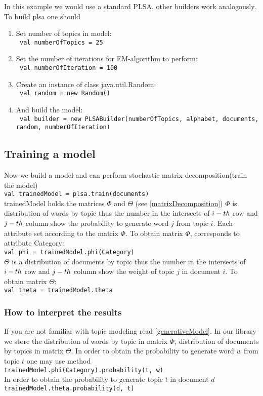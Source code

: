     In this example we would
    use a standard PLSA, other builders work analogously.  To build plsa one should
    \begin{enumerate}
	\item Set number of topics in model: \\ \texttt{ val numberOfTopics = 25}
	\item Set the number of iterations for EM\--algorithm to perform: \\ \texttt{ val numberOfIteration = 100}
	\item Create an instance of class java.util.Random: \\     \texttt{ val random = new Random()}
	\item And build the model: \\ \texttt{ val builder = new PLSABuilder(numberOfTopics, alphabet, documents, random,  numberOfIteration)}
    \end{enumerate}

\subsection*{Training a model}
    Now we build a model and can perform stochastic matrix decomposition(train the model) \\
    \texttt{val trainedModel = plsa.train(documents)}\\
    trainedModel holds the matrices $\Phi$ and $\Theta$ (see \ref{matrixDecomposition})
    $\Phi$ is distribution of words by topic thus the number in the intersects of $i\--th$ row and $j\--th$ column show the
    probability to generate word $j$ from topic $i$. Each attribute set according to the matrix $\Phi$.
    To obtain matrix $\Phi$, corresponds to attribute Category:\\
    \texttt{val phi = trainedModel.phi(Category)}\\
    $\Theta$ is a distribution of documents by topic thus the number in the intersects of $i\--th$ row and $j\--th$ column show
    the weight of topic $j$ in document $i$.
    To obtain matrix $\Theta$: \\
    \texttt{val theta = trainedModel.theta}\\

    \subsubsection*{How to interpret the results}
	If you are not familiar with topic modeling read \ref{generativeModel}. In our library we store the distribution of words by topic in matrix $\Phi$,
	distribution of documents by topics in matrix $\Theta$. In order to obtain the probability to generate word $w$ from topic $t$ one may use method \\
	\texttt{trainedModel.phi(Category).probability(t, w)}\\
	In order to obtain the probability to generate topic $t$ in document $d$ \\
	\texttt{trainedModel.theta.probability(d, t)}\\
    
